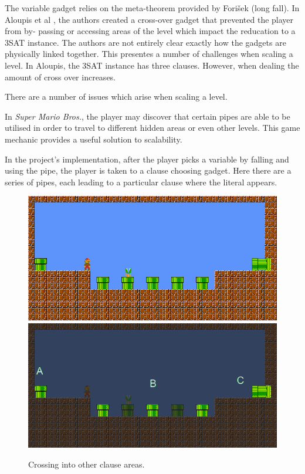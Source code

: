 \documentclass[11pt, a4paper, oneside]{report} %
\begin{document}
The variable gadget relies on the meta-theorem provided by Fori\v{s}ek
\cite{DBLP:conf/fun/Forisek10} (long fall). In Aloupis et al \cite{Aloupis2012},
the authors created a cross-over gadget that prevented the player from by-
passing or accessing areas of the level which impact the reducation to a 3SAT
instance. The authors are not entirely clear exactly how the gadgets are
physically linked together. This presentes a number of challenges when scaling a
level. In Aloupis, the 3SAT instance has three clauses. However, when dealing
the amount of cross over increases.

There are a number of issues which arise when scaling a level.

In \textit{Super Mario Bros.}, the player may discover that certain pipes are
able to be utilised in order to travel to different hidden areas or even other
levels. This game mechanic provides a useful solution to scalability. 

In the project's implementation, after the player picks a variable by falling
and using the pipe, the player is taken to a clause choosing gadget. Here there
are a series of pipes, each leading to a particular clause where the literal
appears.

\begin{figure}[ht!]

  \centering
    \includegraphics[scale=0.70]{clause}
    \includegraphics[scale=0.70]{clause-explain}
  \caption{Crossing into other clause areas.}
  \label{clause-crossing}
\end{figure}
\end{document}
